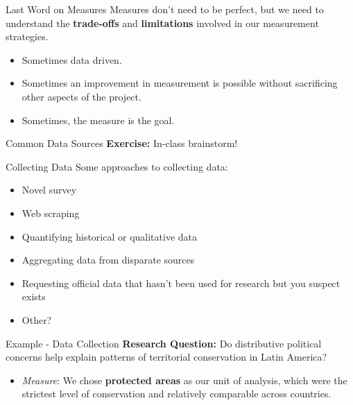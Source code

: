 \documentclass{beamer}
\begin{document}
\begin{frame}{Last Word on Measures}
 Measures don't need to be perfect, but we need to understand the \textbf{trade-offs} and \textbf{limitations} involved in our measurement strategies.
 \begin{itemize}
     \item Sometimes data driven.
     \item Sometimes an improvement in measurement is possible without sacrificing other aspects of the project. 
     \item Sometimes, the measure is the goal. 
 \end{itemize}
\end{frame}


\begin{frame}{Common Data Sources}
\textbf{Exercise:} In-class brainstorm! 
\end{frame}

\begin{frame}{Collecting Data}
Some approaches to collecting data:  
\begin{itemize}
    \item Novel survey
    \item Web scraping 
    \item Quantifying historical or qualitative data 
    \item Aggregating data from disparate sources 
    \item Requesting official data that hasn't been used for research but you suspect exists
    \item Other? 
\end{itemize}
\end{frame} 

\begin{frame}{Example - Data Collection}
\textbf{Research Question:} Do distributive political concerns help explain patterns of territorial conservation in Latin America? 
\begin{itemize}
    \item \textit{Measure}: We chose \textbf{protected areas} as our unit of analysis, which were the strictest level of conservation and relatively comparable across countries.  
\end{itemize}
\end{frame} 
\end{document}
